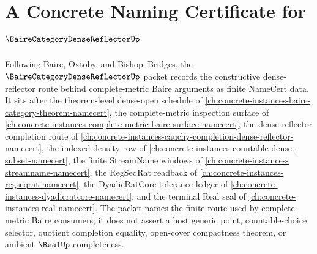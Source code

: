 \chapter{A Concrete Naming Certificate for $\BaireCategoryDenseReflectorUp$}
\label{ch:concrete-instances-baire-category-dense-reflector-namecert}

Following Baire, Oxtoby, and Bishop--Bridges, the $\BaireCategoryDenseReflectorUp$ packet records the constructive dense-reflector route behind complete-metric Baire arguments as finite NameCert data. It sits after the theorem-level dense-open schedule of \autoref{ch:concrete-instances-baire-category-theorem-namecert}, the complete-metric inspection surface of \autoref{ch:concrete-instances-complete-metric-baire-surface-namecert}, the dense-reflector completion route of \autoref{ch:concrete-instances-cauchy-completion-dense-reflector-namecert}, the indexed density row of \autoref{ch:concrete-instances-countable-dense-subset-namecert}, the finite StreamName windows of \autoref{ch:concrete-instances-streamname-namecert}, the RegSeqRat readback of \autoref{ch:concrete-instances-regseqrat-namecert}, the DyadicRatCore tolerance ledger of \autoref{ch:concrete-instances-dyadicratcore-namecert}, and the terminal Real seal of \autoref{ch:concrete-instances-real-namecert}. The packet names the finite route used by complete-metric Baire consumers; it does not assert a host generic point, countable-choice selector, quotient completion equality, open-cover compactness theorem, or ambient $\RealUp$ completeness.

